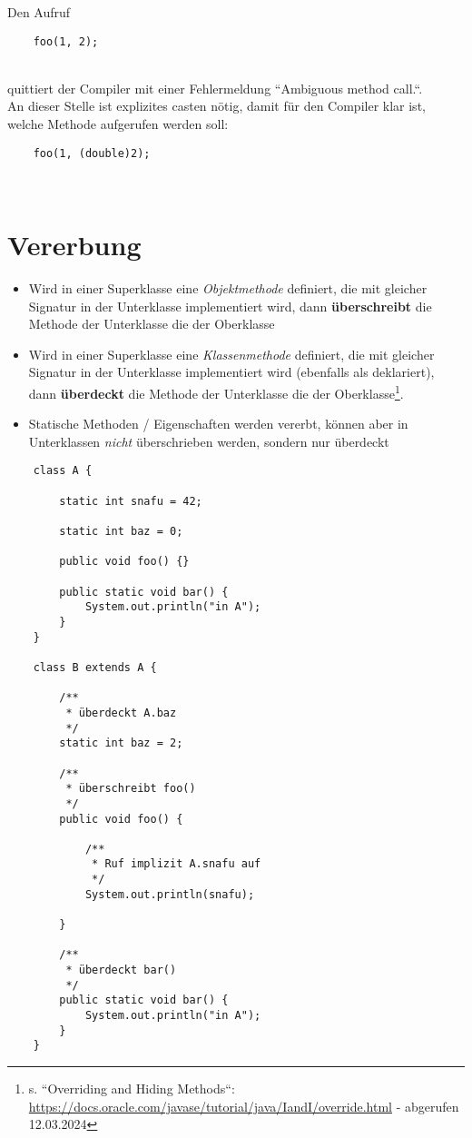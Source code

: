 Den Aufruf

\begin{verbatim}
    foo(1, 2);
\end{verbatim}\\

\noindent
quittiert der Compiler mit einer Fehlermeldung ``Ambiguous method call.``.\\
An dieser Stelle ist explizites casten nötig, damit für den Compiler klar ist, welche Methode aufgerufen werden soll:

\begin{verbatim}
    foo(1, (double)2);
\end{verbatim}\\


\section{Vererbung}

\begin{itemize}
    \item Wird in einer Superklasse eine \textit{Objektmethode} definiert, die mit gleicher Signatur in der Unterklasse implementiert wird, dann \textbf{überschreibt} die Methode der Unterklasse die der Oberklasse
    \item Wird in einer Superklasse eine \textit{Klassenmethode} definiert, die mit gleicher Signatur in der Unterklasse implementiert wird (ebenfalls als  deklariert), dann \textbf{überdeckt} die Methode der Unterklasse die der Oberklasse\footnote{
        s. ``Overriding and Hiding Methods``: \url{https://docs.oracle.com/javase/tutorial/java/IandI/override.html} - abgerufen 12.03.2024
    }.
    \item Statische Methoden / Eigenschaften werden vererbt, können aber in Unterklassen \textit{nicht} überschrieben werden, sondern nur überdeckt
\end{itemize}

\begin{verbatim}
    class A {

        static int snafu = 42;

        static int baz = 0;

        public void foo() {}

        public static void bar() {
            System.out.println("in A");
        }
    }

    class B extends A {

        /**
         * überdeckt A.baz
         */
        static int baz = 2;

        /**
         * überschreibt foo()
         */
        public void foo() {

            /**
             * Ruf implizit A.snafu auf
             */
            System.out.println(snafu);

        }

        /**
         * überdeckt bar()
         */
        public static void bar() {
            System.out.println("in A");
        }
    }
\end{verbatim}
